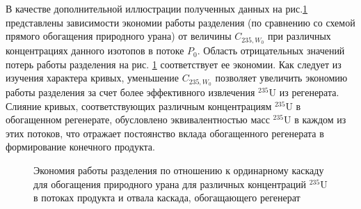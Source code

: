 В качестве дополнительной иллюстрации полученных данных на рис.\ref{Figure_13} представлены зависимости экономии работы разделения (по сравнению со схемой прямого обогащения природного урана) от величины $C_{235, W_0}$ при различных концентрациях данного изотопов в потоке $P_0$. Область отрицательных значений потерь работы разделения на рис. \ref{Figure_13} соответствует ее экономии. Как следует из изучения характера кривых, уменьшение $C_{235, W_0}$ позволяет увеличить экономию работы разделения за счет более эффективного извлечения $^{235}$U из регенерата. Слияние кривых, соответствующих различным концентрациям $^{235}$U в обогащенном регенерате, обусловлено эквивалентностью масс $^{235}$U в каждом из этих потоков, что отражает постоянство вклада обогащенного регенерата в формирование конечного продукта.



\begin{figure}[ht]
  \caption{Экономия работы разделения по отношению к ординарному каскаду для обогащения природного урана для различных концентраций $^{235}$U в потоках продукта и отвала каскада, обогащающего регенерат}\label{Figure_13}
\end{figure}



